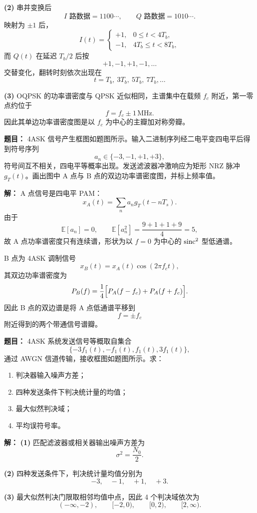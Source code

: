 \textbf{(2)} 串并变换后
\[
I\text{ 路数据}=1100\cdots,\qquad Q\text{ 路数据}=1010\cdots.
\]
映射为 $\pm1$ 后，
\[
I(t)
=
\begin{cases}
+1,&0\le t<4T_b,\\
-1,&4T_b\le t<8T_b,
\end{cases}
\]
而 $Q(t)$ 在延迟 $T_b/2$ 后按
\[
+1,-1,+1,-1,\dots
\]
交替变化，翻转时刻依次出现在
\[
t=T_b,\ 3T_b,\ 5T_b,\ 7T_b,\dots
\]

\textbf{(3)} OQPSK 的功率谱密度与 QPSK 近似相同，主谱集中在载频 $f_c$ 附近，第一零点约位于
\[
f=f_c\pm 1\,\mathrm{MHz}.
\]
因此其单边功率谱密度图是以 $f_c$ 为中心的主瓣加对称旁瓣。

\medskip
{}
\textbf{题目：}
4ASK 信号产生框图如题图所示。输入二进制序列经二电平变四电平后得到符号序列
\[
a_n\in\{-3,-1,+1,+3\},
\]
符号间互不相关，四电平等概率出现。发送滤波器冲激响应为矩形 NRZ 脉冲 $g_T(t)$。画出图中 A 点与 B 点的双边功率谱密度图，并标上频率值。

\par\textbf{解：}
A 点信号是四电平 PAM：
\[
x_A(t)=\sum_n a_n g_T(t-nT_s).
\]
由于
\[
\mathbb{E}[a_n]=0,\qquad
\mathbb{E}[a_n^2]=\frac{9+1+1+9}{4}=5,
\]
故 A 点功率谱密度只有连续谱，形状为以 $f=0$ 为中心的 $\operatorname{sinc}^2$ 型低通谱。

B 点为 4ASK 调制信号
\[
x_B(t)=x_A(t)\cos(2\pi f_ct),
\]
其双边功率谱密度为
\[
P_B(f)=\frac14\Bigl[P_A(f-f_c)+P_A(f+f_c)\Bigr].
\]
因此 B 点的双边谱是将 A 点低通谱平移到
\[
f=\pm f_c
\]
附近得到的两个带通信号谱瓣。

\medskip
{}
\textbf{题目：}
4ASK 系统发送信号等概取自集合
\[
\{-3f_1(t),-f_1(t),f_1(t),3f_1(t)\},
\]
通过 AWGN 信道传输，接收框图如题图所示。求：
\begin{enumerate}
\item 判决器输入噪声方差；
\item 四种发送条件下判决统计量的均值；
\item 最大似然判决域；
\item 平均误符号率。
\end{enumerate}

\par\textbf{解：}
\textbf{(1)} 匹配滤波器或相关器输出噪声方差为
\[
\sigma^2=\frac{N_0}{2}.
\]

\textbf{(2)} 四种发送条件下，判决统计量均值分别为
\[
-3,\quad -1,\quad +1,\quad +3.
\]

\textbf{(3)} 最大似然判决门限取相邻均值中点，因此 4 个判决域依次为
\[
(-\infty,-2),\qquad [-2,0),\qquad [0,2),\qquad [2,\infty).
\]

